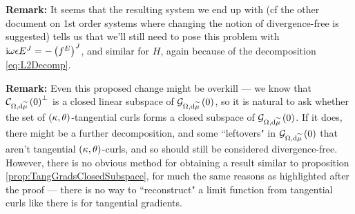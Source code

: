\documentclass[11pt]{report}
\begin{document}
\textbf{Remark:} It seems that the resulting system we end up with (cf the other document on 1st order systems where changing the notion of divergence-free is suggested) tells us that we'll still need to pose this problem with $\mathrm{i}\omega\epsilon E^J = -\left( f^E \right)^J$, and similar for $H$, again because of the decomposition \eqref{eq:L2Decomp}.

\textbf{Remark:} Even this proposed change might be overkill --- we know that $\mathcal{C}_{ \Omega, \mathrm{d}\widetilde{\mu}}\left( 0 \right)^\perp$ is a closed linear subspace of $\mathcal{G}_{ \Omega, \mathrm{d}\widetilde{\mu}}\left( 0 \right)$, so it is natural to ask whether the set of $\left( \kappa, \theta \right)$-tangential curls forms a closed subspace of $\mathcal{G}_{ \Omega, \mathrm{d}\widetilde{\mu}}\left( 0 \right)$.
If it does, there might be a further decomposition, and some ``leftovers" in $\mathcal{G}_{ \Omega, \mathrm{d}\widetilde{\mu}}\left( 0 \right)$ that aren't tangential $\left( \kappa, \theta \right)$-curls, and so should still be considered divergence-free.
However, there is no obvious method for obtaining a result similar to proposition \ref{prop:TangGradsClosedSubspace}, for much the same reasons as highlighted after the proof --- there is no way to ``reconstruct" a limit function from tangential curls like there is for tangential gradients.
\end{document}
